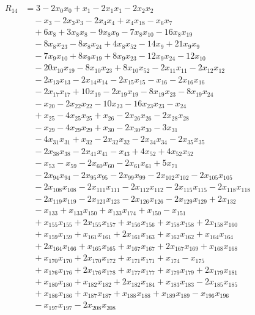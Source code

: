 \begin{align*}
R_{14}&={}3 -2x_{0}x_{0} +x_{1} -2x_{1}x_{1} -2x_{2}x_{2}\\
&\quad{}-x_{3} -2x_{3}x_{3} -2x_{4}x_{4} +x_{4}x_{18} -x_{6}x_{7}\\
&\quad{}+6x_{8} +3x_{8}x_{8} -9x_{8}x_{9} -7x_{8}x_{10} -16x_{8}x_{19}\\
&\quad{}-8x_{8}x_{23} -8x_{8}x_{24} +4x_{8}x_{52} -14x_{9} +21x_{9}x_{9}\\
&\quad{}-7x_{9}x_{10} +8x_{9}x_{19} +8x_{9}x_{23} -12x_{9}x_{24} -12x_{10}\\
&\quad{}-20x_{10}x_{19} -8x_{10}x_{23} +8x_{10}x_{52} -2x_{11}x_{11} -2x_{12}x_{12}\\
&\quad{}-2x_{13}x_{13} -2x_{14}x_{14} -2x_{15}x_{15} -x_{16} -2x_{16}x_{16}\\
&\quad{}-2x_{17}x_{17} +10x_{19} -2x_{19}x_{19} -8x_{19}x_{23} -8x_{19}x_{24}\\
&\quad{}-x_{20} -2x_{22}x_{22} -10x_{23} -16x_{23}x_{23} -x_{24}\\
&\quad{}+x_{25} -4x_{25}x_{25} +x_{26} -2x_{26}x_{26} -2x_{28}x_{28}\\
&\quad{}-x_{29} -4x_{29}x_{29} +x_{30} -2x_{30}x_{30} -3x_{31}\\
&\quad{}-4x_{31}x_{31} +x_{32} -2x_{32}x_{32} -2x_{34}x_{34} -2x_{35}x_{35}\\
&\quad{}-2x_{38}x_{38} -2x_{41}x_{41} -x_{43} +4x_{52} +4x_{52}x_{52}\\
&\quad{}-x_{53} -x_{59} -2x_{60}x_{60} -2x_{61}x_{61} +5x_{71}\\
&\quad{}-2x_{94}x_{94} -2x_{95}x_{95} -2x_{99}x_{99} -2x_{102}x_{102} -2x_{105}x_{105}\\
&\quad{}-2x_{108}x_{108} -2x_{111}x_{111} -2x_{112}x_{112} -2x_{115}x_{115} -2x_{118}x_{118}\\
&\quad{}-2x_{119}x_{119} -2x_{123}x_{123} -2x_{126}x_{126} -2x_{129}x_{129} +2x_{132}\\
&\quad{}-x_{133} +x_{133}x_{150} +x_{133}x_{174} +x_{150} -x_{151}\\
&\quad{}+x_{155}x_{155} +2x_{155}x_{157} +x_{156}x_{156} +x_{158}x_{158} +2x_{158}x_{160}\\
&\quad{}+x_{159}x_{159} +x_{161}x_{161} +2x_{161}x_{163} +x_{162}x_{162} +x_{164}x_{164}\\
&\quad{}+2x_{164}x_{166} +x_{165}x_{165} +x_{167}x_{167} +2x_{167}x_{169} +x_{168}x_{168}\\
&\quad{}+x_{170}x_{170} +2x_{170}x_{172} +x_{171}x_{171} +x_{174} -x_{175}\\
&\quad{}+x_{176}x_{176} +2x_{176}x_{178} +x_{177}x_{177} +x_{179}x_{179} +2x_{179}x_{181}\\
&\quad{}+x_{180}x_{180} +x_{182}x_{182} +2x_{182}x_{184} +x_{183}x_{183} -2x_{185}x_{185}\\
&\quad{}+x_{186}x_{186} +x_{187}x_{187} +x_{188}x_{188} +x_{189}x_{189} -x_{196}x_{196}\\
&\quad{}-x_{197}x_{197} -2x_{208}x_{208}
\end{align*}
